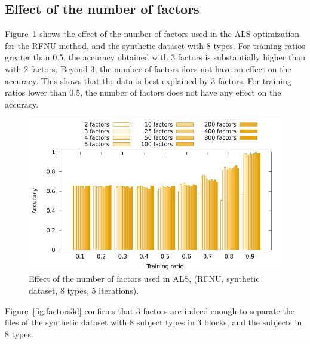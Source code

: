 \documentclass[10pt, conference, compsocconf]{IEEEtran}
\begin{document}
\subsection{Effect of the number of factors}
Figure~\ref{fig:factors} shows the effect of the number of factors used 
in the ALS optimization for the RFNU method, and the synthetic dataset with 8 types. 
For training ratios greater than 0.5, the accuracy obtained 
with 3 factors is substantially higher than with 2 factors. Beyond 
3, the number of factors does not have an effect on the accuracy. 
This shows that the data is best explained by 3 factors. For training 
ratios lower than 0.5, the number of factors does not have any effect 
on the accuracy.

\begin{figure}[h]
\includegraphics[width=0.9\columnwidth]{data/results/means_of_results/ALS/Synthetic/8type-RFNU-Differ-Num-Factors/ALS-8-types-ranks.pdf}
\caption{Effect of the number of factors used in ALS, (RFNU, synthetic dataset, 8 types, 5 iterations).}
\label{fig:factors}
\end{figure}

Figure~\ref{fig:factors3d} confirms that 3 factors are indeed enough to 
separate the files of the synthetic dataset with 8 subject types in 3 
blocks, and the subjects in 8 types.
\end{document}
